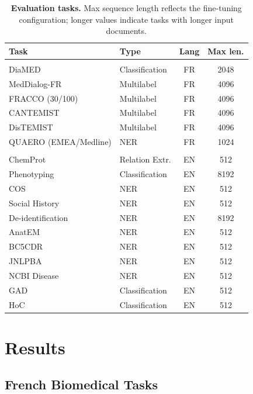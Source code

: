 \begin{table}[t]
\centering
\small
\begin{tabular}{llcc}
\toprule
\textbf{Task} & \textbf{Type} & \textbf{Lang} & \textbf{Max len.} \\
\midrule
\rowcolor{ThesisTableSep} \multicolumn{4}{c}{\rule{0pt}{9pt}\textbf{French}} \\[1pt]
DiaMED & Classification & FR & 2048 \\
MedDialog-FR & Multilabel & FR & 4096 \\
FRACCO (30/100) & Multilabel & FR & 4096 \\
CANTEMIST & Multilabel & FR & 4096 \\
DisTEMIST & Multilabel & FR & 4096 \\
QUAERO (EMEA/Medline) & NER & FR & 1024 \\
\midrule
\rowcolor{ThesisTableSep} \multicolumn{4}{c}{\rule{0pt}{9pt}\textbf{English}} \\[1pt]
ChemProt & Relation Extr. & EN & 512 \\
Phenotyping & Classification & EN & 8192 \\
COS & NER & EN & 512 \\
Social History & NER & EN & 512 \\
De-identification & NER & EN & 8192 \\
AnatEM & NER & EN & 512 \\
BC5CDR & NER & EN & 512 \\
JNLPBA & NER & EN & 512 \\
NCBI Disease & NER & EN & 512 \\
GAD & Classification & EN & 512 \\
HoC & Classification & EN & 512 \\
\bottomrule
\end{tabular}
\caption{\textbf{Evaluation tasks.} Max sequence length reflects the fine-tuning configuration; longer values indicate tasks with longer input documents.}
\label{tab:eval-tasks}
\end{table}


\section{Results}

\subsection{French Biomedical Tasks}

